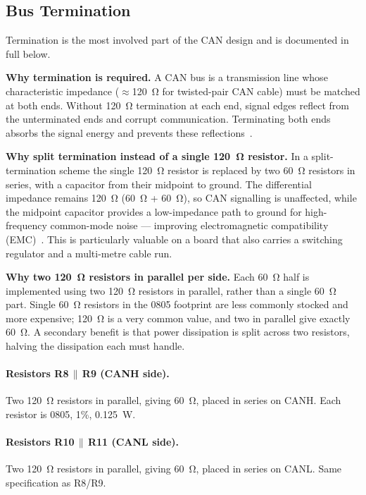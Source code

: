 \subsection{Bus Termination}
\label{subsec:can-term}

Termination is the most involved part of the CAN design and is documented in full below.

\textbf{Why termination is required.} A CAN bus is a transmission line whose
characteristic impedance ($\approx$\SI{120}{\ohm} for twisted-pair CAN cable) must be
matched at both ends. Without \SI{120}{\ohm} termination at each end, signal edges reflect
from the unterminated ends and corrupt communication. Terminating both ends absorbs the
signal energy and prevents these reflections~\cite{ref16}.

\textbf{Why split termination instead of a single \SI{120}{\ohm} resistor.} In a
split-termination scheme the single \SI{120}{\ohm} resistor is replaced by two
\SI{60}{\ohm} resistors in series, with a capacitor from their midpoint to ground. The
differential impedance remains \SI{120}{\ohm} (\SI{60}{\ohm} + \SI{60}{\ohm}), so CAN
signalling is unaffected, while the midpoint capacitor provides a low-impedance path to
ground for high-frequency common-mode noise --- improving electromagnetic compatibility
(EMC)~\cite{ref17,ref18}. This is particularly valuable on a board that also carries a
switching regulator and a multi-metre cable run.

\textbf{Why two \SI{120}{\ohm} resistors in parallel per side.} Each \SI{60}{\ohm} half
is implemented using two \SI{120}{\ohm} resistors in parallel, rather than a single
\SI{60}{\ohm} part. Single \SI{60}{\ohm} resistors in the 0805 footprint are less
commonly stocked and more expensive; \SI{120}{\ohm} is a very common value, and two in
parallel give exactly \SI{60}{\ohm}. A secondary benefit is that power dissipation is
split across two resistors, halving the dissipation each must handle.

\paragraph{Resistors R8\,$\parallel$\,R9 (CANH side).}
Two \SI{120}{\ohm} resistors in parallel, giving \SI{60}{\ohm}, placed in series on CANH.
Each resistor is 0805, 1\%, \SI{0.125}{\watt}.

\paragraph{Resistors R10\,$\parallel$\,R11 (CANL side).}
Two \SI{120}{\ohm} resistors in parallel, giving \SI{60}{\ohm}, placed in series on CANL.
Same specification as R8/R9.

